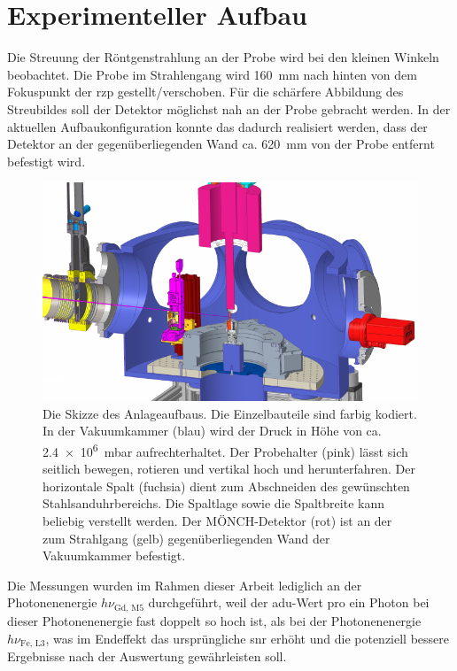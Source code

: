 \chapter{Experimenteller Aufbau}
Die Streuung der Röntgenstrahlung an der Probe wird bei den kleinen Winkeln beobachtet. Die Probe im Strahlengang wird \SI{160}{\milli\meter} nach hinten von dem Fokuspunkt der \gls{rzp} gestellt/verschoben. Für die schärfere Abbildung des Streubildes soll der Detektor möglichst nah an der Probe gebracht werden. In der aktuellen Aufbaukonfiguration konnte das dadurch realisiert werden, dass der Detektor an der gegenüberliegenden Wand ca. \SI{620}{\milli\meter} von der Probe entfernt befestigt wird.
\begin{figure}[H]
    \centering
    \includegraphics{images/aufbau/aufbau_empty.pdf}
    \caption{Die Skizze des Anlageaufbaus. Die Einzelbauteile sind farbig kodiert. In der Vakuumkammer (blau) wird der Druck in Höhe von ca. \SI{2.4e6}{\milli\bar} aufrechterhaltet. Der Probehalter (pink) lässt sich seitlich bewegen, rotieren und vertikal hoch und herunterfahren. Der horizontale Spalt (fuchsia) dient zum Abschneiden des gewünschten Stahlsanduhrbereichs. Die Spaltlage sowie die Spaltbreite kann beliebig verstellt werden. Der MÖNCH-Detektor (rot) ist an der zum Strahlgang (gelb) gegenüberliegenden Wand der Vakuumkammer befestigt.}
    \label{fig:anlage}
\end{figure}
\noindent
Die Messungen wurden im Rahmen dieser Arbeit lediglich an der Photonenenergie $h\nu_\text{Gd, M5}$ durchgeführt, weil der \gls{adu}-Wert pro ein Photon bei dieser Photonenenergie fast doppelt so hoch ist, als bei der Photonenenergie $h\nu_\text{Fe, L3}$, was im Endeffekt das ursprüngliche \gls{snr} erhöht und die potenziell bessere Ergebnisse nach der Auswertung gewährleisten soll.

